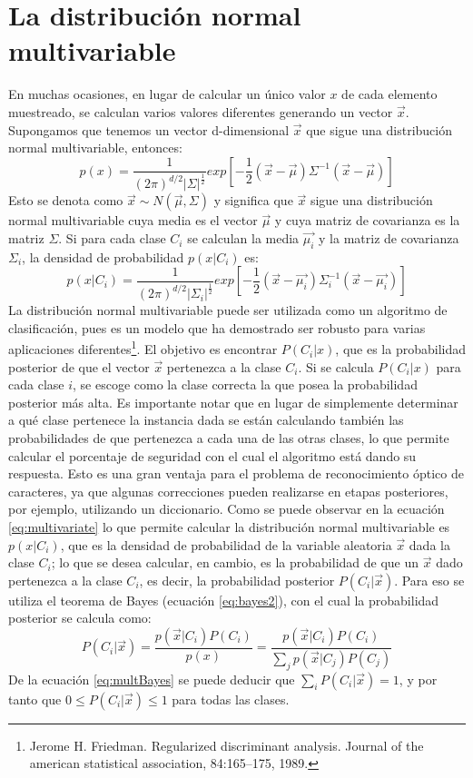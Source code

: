 \documentclass[a4paper, 11pt, oneside]{report}
\begin{document}
\section{La distribución normal multivariable}
\label{sect:multivar}
En muchas ocasiones, en lugar de calcular un único valor $x$ de cada elemento muestreado, se calculan varios valores diferentes generando un vector $\vec{x}$. Supongamos que tenemos un vector d-dimensional $\vec{x}$ que sigue una distribución normal multivariable, entonces:
\begin{equation}\label{eq:multDens}
p(x) = \frac{1}{(2\pi)^{d/2}|\Sigma|^\frac{1}{2}} exp\left[{-\frac{1}{2}(\vec{x}-\vec{\mu})\Sigma^{-1}(\vec{x}-\vec{\mu})}\right]
\end{equation}
Esto se denota como $\vec{x} \sim N(\vec{\mu},\Sigma)$ y significa que $\vec{x}$ sigue una distribución normal multivariable cuya media es el vector $\vec{\mu}$ y cuya matriz de covarianza es la matriz $\Sigma$. Si para cada clase $C_i$ se calculan la media $\vec{\mu_i}$ y la matriz de covarianza $\Sigma_i$, la densidad de probabilidad $p(x|C_i)$ es:
\begin{equation}\label{eq:multivariate}
p(x|C_i) = \frac{1}{(2\pi)^{d/2}|\Sigma_i|^\frac{1}{2}} exp\left[{-\frac{1}{2}(\vec{x}-\vec{\mu_i})\Sigma_i^{-1}(\vec{x}-\vec{\mu_i})}\right]
\end{equation}
La distribución normal multivariable puede ser utilizada como un algoritmo de clasificación, pues es un modelo que ha demostrado ser robusto para varias aplicaciones diferentes\footnote{Jerome H. Friedman. Regularized discriminant analysis. Journal of the american statistical association, 84:165–175, 1989.}. El objetivo es encontrar $P(C_i|x)$, que es la probabilidad posterior de que el vector $\vec{x}$ pertenezca a la clase $C_i$. Si se calcula $P(C_i|x)$ para cada clase $i$, se escoge como la clase correcta la que posea la probabilidad posterior más alta.
Es importante notar que en lugar de simplemente determinar a qué clase pertenece la instancia dada se están calculando también las probabilidades de que pertenezca a cada una de las otras clases, lo que permite calcular el porcentaje de seguridad con el cual el algoritmo está dando su respuesta. Esto es una gran ventaja para el problema de reconocimiento óptico de caracteres, ya que algunas correcciones pueden realizarse en etapas posteriores, por ejemplo, utilizando un diccionario.
Como se puede observar en la ecuación \eqref{eq:multivariate} lo que permite calcular la distribución normal multivariable es $p(x|C_i)$, que es la densidad de probabilidad de la variable aleatoria $\vec{x}$ dada la clase $C_i$; lo que se desea calcular, en cambio, es la probabilidad de que un $\vec{x}$ dado pertenezca a la clase $C_i$, es decir, la probabilidad posterior $P(C_i|\vec{x})$. Para eso se utiliza el teorema de Bayes (ecuación \ref{eq:bayes2}), con el cual la probabilidad posterior se calcula como:
\begin{equation}\label{eq:multBayes}
P(C_i|\vec{x}) = \frac{p(\vec{x}|C_i)P(C_i)}{p(x)} = \frac{p(\vec{x}|C_i)P(C_i)}{ \sum_j{p(\vec{x}|C_j)P(C_j)} }
\end{equation}
De la ecuación \ref{eq:multBayes} se puede deducir que $\sum_i{P(C_i|\vec{x})}=1$, y por tanto que $0 \le P(C_i|\vec{x}) \le 1$ para todas las clases.
\end{document}
